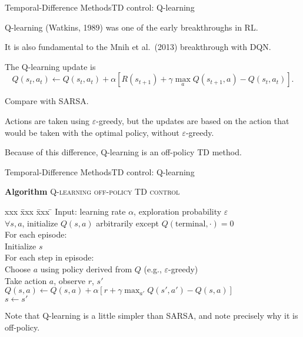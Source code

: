 \documentclass{beamer}
\begin{document}
\begin{frame}{Temporal-Difference Methods}{TD control: Q-learning}

  \alert{Q-learning} (Watkins, 1989) was one of the early
  breakthroughs in RL.

  \medskip

  It is also fundamental to the Mnih et al.\ (2013) breakthrough with DQN.

  \medskip

  The Q-learning update is
  $$Q(s_t,a_t) \leftarrow Q(s_t,a_t) + \alpha \left[ R(s_{t+1}) + \gamma
    \max_a Q(s_{t+1},a) - Q(s_t,a_t) \right]. $$

  \medskip

  Compare with SARSA.

  \medskip
  
  Actions are taken using $\varepsilon$-greedy, but the updates are
  based on the action that would be taken with the optimal policy,
  without $\varepsilon$-greedy.

  \medskip

  Because of this difference, Q-learning is an \alert{off-policy} TD
  method.

\end{frame}


\begin{frame}{Temporal-Difference Methods}{TD control: Q-learning}
  
  \begin{block}{\textbf{Algorithm} \textsc{Q-learning off-policy TD control}}
  \begin{tabbing}
    xxx \= xxx \= xxx \= \kill
    \> Input: learning rate $\alpha$, exploration probability $\varepsilon$ \\
    \> $\forall s, a$, initialize $Q(s,a)$ arbitrarily
    except $Q(\mathrm{terminal},\cdot) = 0$ \\
    \> For each episode: \\
    \> \> Initialize $s$ \\
    \> \> For each step in episode: \\
    \> \> \> Choose $a$ using policy derived from $Q$ (e.g., $\varepsilon$-greedy) \\
    \> \> \> Take action $a$, observe $r$, $s'$ \\
    \> \> \> $Q(s,a) \leftarrow Q(s,a) + \alpha \left[ r + \gamma \max_{a'} Q(s', a') - Q(s, a) \right]$ \\
    \> \> \> $s \leftarrow s'$
  \end{tabbing}
  \end{block}

  \medskip
  
  Note that Q-learning is a little simpler than SARSA, and note
  precisely why it is off-policy.

\end{frame}
\end{document}
